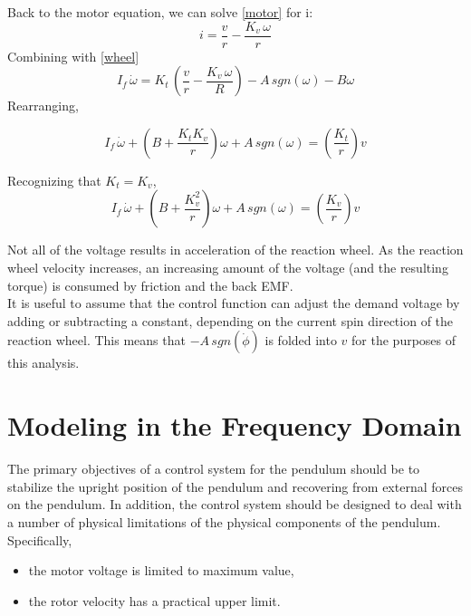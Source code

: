\documentclass[12pt,letterpaper]{article}
\begin{document}
Back to the motor equation, we can solve \eqref{motor} for i:
%
\begin{equation}
    i = \frac{v}{r} - \frac{K_{v} \, \omega}{r}
\end{equation}
%
Combining with \eqref{wheel}
%
\begin{equation}
    I_{f} \, \dot{\omega}  =  K_{t} \, \left( \frac{v}{r} - \frac{ K_{v} \, \omega}{R} \right) - A \, sgn(\omega ) - B \omega
\end{equation}
Rearranging,

\begin{equation}
    I_{f} \, \dot{\omega} + \left( B+\frac{K_{t} K_{v}}{r} \right) \omega +A \, sgn(\omega)= \left(\frac{K_{t}} {r}\right)v 
\end{equation}

Recognizing that $K_{t} = K_{v}$,
\begin{equation}
    I_{f} \, \dot{\omega} + \left( B+\frac{K_{v}^2}{r} \right) \omega +A \, sgn(\omega)= \left(\frac{K_{v}} {r}\right)v\label{eq.motorFinal} 
\end{equation}

Not all of the voltage results in acceleration of the reaction wheel.  As the reaction wheel velocity increases, an
increasing amount of the voltage (and the resulting torque) is consumed by friction and the back EMF.\\

It is useful to assume that the control function can adjust the demand voltage by adding or subtracting a constant, depending on the current spin direction of the reaction wheel.  This means that $-A\,sgn(\dot{\phi})$ is folded
into $v$ for the purposes of this analysis.  









\section{Modeling in the Frequency Domain}


The primary objectives of a control system for the pendulum should be to stabilize the upright position of the pendulum and recovering from external forces on the pendulum.  In addition, the control system should be designed to deal with a number
of physical limitations of the physical components of the pendulum.  Specifically,
\begin{itemize}
    \item the motor voltage is limited to maximum value,
    \item the rotor velocity has a practical upper limit.
\end{itemize}
\end{document}
